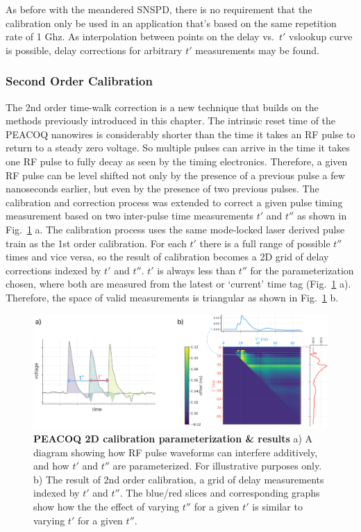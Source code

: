 \documentclass[11pt]{caltech_thesis} %
\begin{document}
As before with the meandered SNSPD, there is no requirement that the calibration only be used in an application that's based on the same repetition rate of 1 Ghz. As interpolation between points on the delay vs.~$t'$ vslookup curve is possible, delay corrections for arbitrary $t'$ measurements may be found.

\hypertarget{second-order-calibration}{%
\subsubsection{Second Order Calibration}\label{second-order-calibration}}

The 2nd order time-walk correction is a new technique that builds on the methods previously introduced in this chapter. The intrinsic reset time of the PEACOQ nanowires is considerably shorter than the time it takes an RF pulse to return to a steady zero voltage. So multiple pulses can arrive in the time it takes one RF pulse to fully decay as seen by the timing electronics. Therefore, a given RF pulse can be level shifted not only by the presence of a previous pulse a few nanoseconds earlier, but even by the presence of two previous pulses. The calibration and correction process was extended to correct a given pulse timing measurement based on two inter-pulse time measurements $t'$ and $t''$ as shown in Fig.~\ref{fig:order_2nd} a. The calibration process uses the same mode-locked laser derived pulse train as the 1st order calibration. For each $t'$ there is a full range of possible $t''$ times and vice versa, so the result of calibration becomes a 2D grid of delay corrections indexed by $t'$ and $t''$. $t'$ is always less than $t''$ for the parameterization chosen, where both are measured from the latest or `current' time tag (Fig.~\ref{fig:order_2nd} a). Therefore, the space of valid measurements is triangular as shown in Fig.~\ref{fig:order_2nd} b.

\hypertarget{fig:order_2nd}{%
\begin{figure}
\centering
\includegraphics[width=1\textwidth,height=\textheight]{./chapter_03/figs/SOM_Figure_order_2nd_v1_light.pdf}
\caption[{PEACOQ 2D calibration parameterization \& results}]{\textbf{PEACOQ 2D calibration parameterization \& results} a) A diagram showing how RF pulse waveforms can interfere additively, and how $t'$ and $t''$ are parameterized. For illustrative purposes only. b) The result of 2nd order calibration, a grid of delay measurements indexed by $t'$ and $t''$. The blue/red slices and corresponding graphs show how the the effect of varying $t''$ for a given $t'$ is similar to varying $t'$ for a given $t''$.}
\label{fig:order_2nd}
\end{figure}
}
\end{document}
